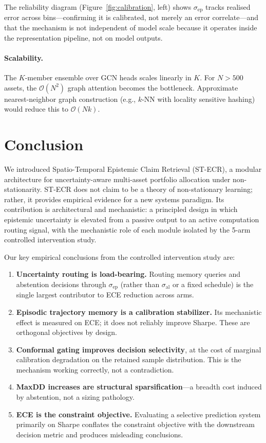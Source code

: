 \documentclass[11pt,a4paper]{article}
\newcommand{\sep}{\sigma_{\mathrm{ep}}}
\newcommand{\sal}{\sigma_{\mathrm{al}}}
\begin{document}
The reliability diagram (Figure~\ref{fig:calibration}, left) shows $\sep$
tracks realised error across bins---confirming it is calibrated, not merely
an error correlate---and that the mechanism is not independent of model scale
because it operates inside the representation pipeline, not on model outputs.

\paragraph{Scalability.}
The $K$-member ensemble over GCN heads scales linearly in $K$.  For $N > 500$
assets, the $\mathcal{O}(N^2)$ graph attention becomes the bottleneck.
Approximate nearest-neighbor graph construction (e.g., $k$-NN with locality
sensitive hashing) would reduce this to $\mathcal{O}(N k)$.

\section{Conclusion}
\label{sec:conclusion}

We introduced Spatio-Temporal Epistemic Claim Retrieval (ST-ECR), a modular
architecture for uncertainty-aware multi-asset portfolio allocation under
non-stationarity.  ST-ECR does not claim to be a theory of non-stationary
learning; rather, it provides empirical evidence for a new systems paradigm.  Its contribution is architectural and mechanistic: a principled
design in which epistemic uncertainty is elevated from a passive output to
an active computation routing signal, with the mechanistic role of each module isolated
by the 5-arm controlled intervention study.

Our key empirical conclusions from the controlled intervention study are:
\begin{enumerate}
\item \textbf{Uncertainty routing is load-bearing.}  Routing memory queries
  and abstention decisions through $\sep$ (rather than $\sal$ or a fixed
  schedule) is the single largest contributor to ECE reduction across arms.
\item \textbf{Episodic trajectory memory is a calibration stabilizer.}
  Its mechanistic effect is measured on ECE; it does not reliably improve
  Sharpe.  These are orthogonal objectives by design.
\item \textbf{Conformal gating improves decision selectivity}, at the cost
  of marginal calibration degradation on the retained sample distribution.
  This is the mechanism working correctly, not a contradiction.
\item \textbf{MaxDD increases are structural sparsification}---a breadth
  cost induced by abstention, not a sizing pathology.
\item \textbf{ECE is the constraint objective.}  Evaluating a selective
  prediction system primarily on Sharpe conflates the constraint objective
  with the downstream decision metric and produces misleading conclusions.
\end{enumerate}
\end{document}
